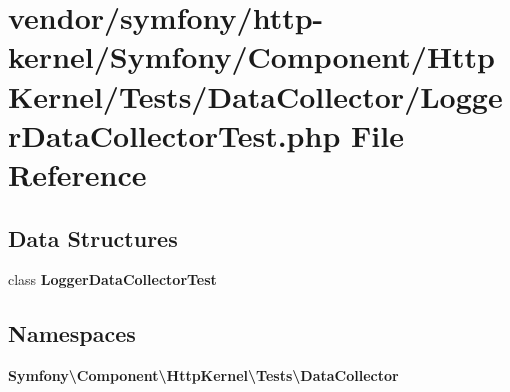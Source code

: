 \section{vendor/symfony/http-\/kernel/\+Symfony/\+Component/\+Http\+Kernel/\+Tests/\+Data\+Collector/\+Logger\+Data\+Collector\+Test.php File Reference}
\label{_logger_data_collector_test_8php}
\subsection*{Data Structures}
\begin{DoxyCompactItemize}
\item 
class {\bf Logger\+Data\+Collector\+Test}
\end{DoxyCompactItemize}
\subsection*{Namespaces}
\begin{DoxyCompactItemize}
\item 
 {\bf Symfony\textbackslash{}\+Component\textbackslash{}\+Http\+Kernel\textbackslash{}\+Tests\textbackslash{}\+Data\+Collector}
\end{DoxyCompactItemize}
